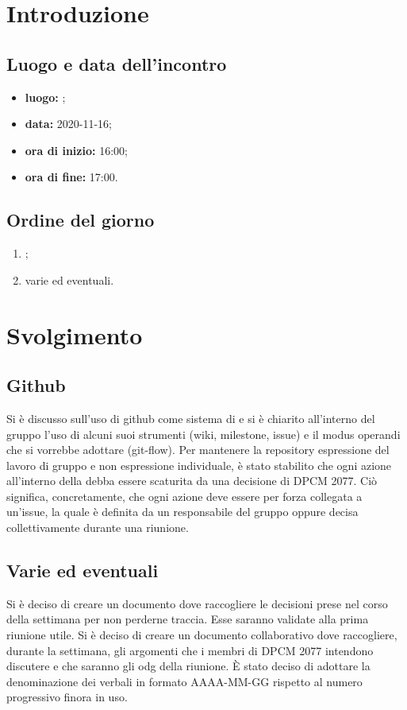 \section*{Introduzione}
\subsection*{Luogo e data dell'incontro}
\begin{itemize}
	\item \textbf{luogo:} ;
	\item \textbf{data:} 2020-11-16;
	\item \textbf{ora di inizio:} 16:00;
	\item \textbf{ora di fine:} 17:00.
\end{itemize}

\subsection*{Ordine del giorno}
\begin{enumerate}
	\item {};
	\item varie ed eventuali.
\end{enumerate}

\section*{Svolgimento}
\subsection*{Github}
Si è discusso sull'uso di github come sistema di 
e si è chiarito all'interno del gruppo l'uso di alcuni suoi strumenti (wiki, milestone, issue) e il modus operandi che si vorrebbe adottare (git-flow). Per mantenere la repository espressione del lavoro di gruppo e non espressione individuale, è stato stabilito che ogni azione all'interno della  debba essere scaturita da una decisione di DPCM 2077. Ciò significa, concretamente, che ogni azione deve essere per forza collegata a un'issue, la quale è definita da un responsabile del gruppo oppure decisa collettivamente durante una riunione. 
\subsection*{Varie ed eventuali}
Si è deciso di creare un documento dove raccogliere le decisioni prese nel corso della settimana per non perderne traccia. Esse saranno validate alla prima riunione utile. Si è deciso di creare un documento collaborativo dove raccogliere, durante la settimana, gli argomenti che i membri di DPCM 2077 intendono discutere e che saranno gli odg della riunione.
È stato deciso di adottare la denominazione dei verbali in formato AAAA-MM-GG rispetto al numero progressivo finora in uso.